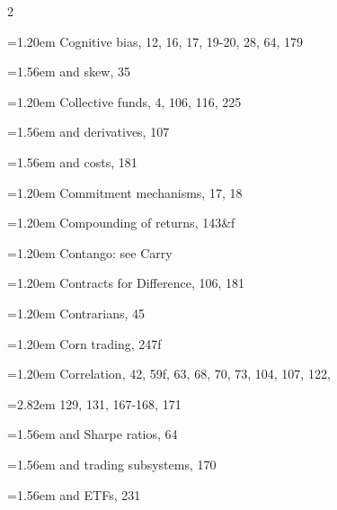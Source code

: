 {\begin{multicols}{2}
\par \noindent\hangindent=1.20em\hspace*{0.00em} Cognitive bias, 12, 16, 17, 19-20, 28, 64, 179
\par \noindent\hangindent=1.56em\hspace*{0.36em} and skew, 35
\par \noindent\hangindent=1.20em\hspace*{0.00em} Collective funds, 4, 106, 116, 225
\par \noindent\hangindent=1.56em\hspace*{0.36em} and derivatives, 107
\par \noindent\hangindent=1.56em\hspace*{0.36em} and costs, 181
\par \noindent\hangindent=1.20em\hspace*{0.00em} Commitment mechanisms, 17, 18
\par \noindent\hangindent=1.20em\hspace*{0.00em} Compounding of returns, 143\&f
\par \noindent\hangindent=1.20em\hspace*{0.00em} Contango: see Carry
\par \noindent\hangindent=1.20em\hspace*{0.00em} Contracts for Difference, 106, 181
\par \noindent\hangindent=1.20em\hspace*{0.00em} Contrarians, 45
\par \noindent\hangindent=1.20em\hspace*{0.00em} Corn trading, 247f
\par \noindent\hangindent=1.20em\hspace*{0.00em} Correlation, 42, 59f, 63, 68, 70, 73, 104, 107, 122,
\par \noindent\hangindent=2.82em\hspace*{1.62em} 129, 131, 167-168, 171
\par \noindent\hangindent=1.56em\hspace*{0.36em} and Sharpe ratios, 64
\par \noindent\hangindent=1.56em\hspace*{0.36em} and trading subsystems, 170
\par \noindent\hangindent=1.56em\hspace*{0.36em} and ETFs, 231

\end{multicols}}
